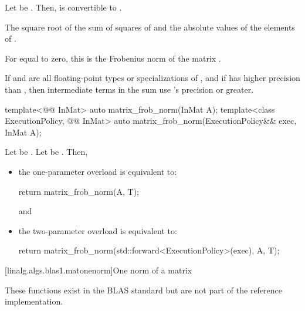 \begin{itemdescr}

\pnum
\mandates
Let  be
.
Then, 
is convertible to .

\pnum
\returns
The square root of the sum of squares
of  and the absolute values of the elements of .
\begin{note}
For  equal to zero,
this is the Frobenius norm of the matrix .
\end{note}

\pnum
\remarks
If  and 
are all floating-point types or specializations of ,
and if  has higher precision
than ,
then intermediate terms in the sum use 's precision or greater.
\end{itemdescr}

%
\begin{itemdecl}
template<@@ InMat>
  auto matrix_frob_norm(InMat A);
template<class ExecutionPolicy, @@ InMat>
  auto matrix_frob_norm(ExecutionPolicy&& exec, InMat A);
\end{itemdecl}

\begin{itemdescr}
\pnum
\effects
Let  be
.
Let  be
.
Then,
\begin{itemize}
\item
the one-parameter overload is equivalent to:
\begin{codeblock}
return matrix_frob_norm(A, T{});
\end{codeblock}
and
\item
the two-parameter overload is equivalent to:
\begin{codeblock}
return matrix_frob_norm(std::forward<ExecutionPolicy>(exec), A, T{});
\end{codeblock}
\end{itemize}
\end{itemdescr}

[linalg.algs.blas1.matonenorm]{One norm of a matrix}

\pnum
\begin{note}
These functions exist in the BLAS standard\supercite{blas-std}
but are not part of the reference implementation.
\end{note}

